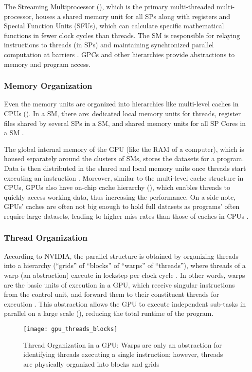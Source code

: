 The Streaming Multiprocessor (), which is the primary multi-threaded multi-processor, houses a shared memory unit for all SPs along with registers and Special Function Units (SFUs), which can calculate specific mathematical functions in fewer clock cycles than threads. The SM is responsible for relaying instructions to threads (in SPs) and maintaining synchronized parallel computation at barriers \cite{PascalWhitepaper, DemystifyingGPU}. GPCs and other hierarchies provide abstractions to memory and program access.

\subsubsection{Memory Organization}
Even the memory units are organized into hierarchies like multi-level caches in CPUs (). In a SM, there are: dedicated local memory units for threads, register files shared by several SPs in a SM, and shared memory units for all SP Cores in a SM \cite{PascalWhitepaper, ParallelNVIDIA}.

The global internal memory of the GPU (like the RAM of a computer), which is housed separately around the clusters of SMs, stores the datasets for a program. Data is then distributed in the shared and local memory units once threads start executing an instruction \cite[Appendix~B]{PattersonARM}. Moreover, similar to the multi-level cache structure in CPUs, GPUs also have on-chip cache hierarchy (), which enables threads to quickly access working data, thus increasing the performance. On a side note, GPUs' caches are often not big enough to hold full datasets as programs' often require large datasets, leading to higher miss rates than those of caches in CPUs \cite[Appendix~B]{PattersonARM}. 

\subsubsection{Thread Organization}
According to NVIDIA, the parallel structure is obtained by organizing threads into a hierarchy (``grids'' of ``blocks'' of ``warps'' of ``threads''), where threads of a warp (an abstraction) execute in lockstep per clock cycle \cite{CUDADocs, DemystifyingGPU} \cite[Appendix~B]{PattersonARM}. In other words, warps are the basic units of execution in a GPU, which receive singular instructions from the control unit, and forward them to their constituent threads for execution \cite{CUDADocs, DemystifyingGPU}. This abstraction allows the GPU to execute independent sub-tasks in parallel on a large scale (), reducing the total runtime of the program.
\begin{figure}[!htbp]
    \centering
    \texttt{[image: gpu\_threads\_blocks]}
    \caption[Thread Organization in a GPU]{Thread Organization in a GPU: Warps are only an abstraction for identifying threads executing a single instruction; however, threads are physically organized into blocks and grids \cite{CUDADocs,ParallelNVIDIA}}
    \label{fig:GPU - Thread Organization in a GPU}
\end{figure}

